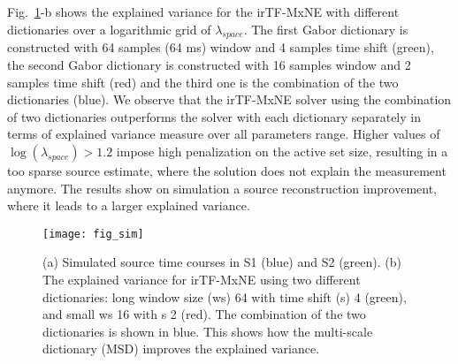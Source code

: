 Fig.~\ref{fig:simulation}-b shows the explained variance for the irTF-MxNE with different dictionaries over a logarithmic grid of $\lambda_{space}$. The first Gabor dictionary is constructed with 64 samples (64 ms) window and 4 samples time shift (green), the second Gabor dictionary is constructed with 16 samples window and 2 samples time shift (red) and the third one is the combination of the two dictionaries (blue). We observe that the irTF-MxNE solver using the combination of two dictionaries outperforms the solver with each dictionary separately in terms of explained variance measure over all parameters range. Higher values of $\log(\lambda_{space})>1.2$ impose high penalization on the active set size, resulting in a too sparse source estimate, where the solution does not explain the measurement anymore. The results show on simulation a source reconstruction improvement, where it leads to a larger explained variance.

\begin{figure}
\centering
	\texttt{[image: fig\_sim]}
    \caption{(a) Simulated source time courses in S1 (blue) and S2 (green). (b) The explained variance for irTF-MxNE using two different dictionaries: long window size (ws) 64 with time shift (s) 4 (green), and small ws 16 with s 2 (red). The combination of the two dictionaries is shown in blue. This shows how the multi-scale dictionary (MSD) improves the explained variance.}
    \label{fig:simulation}
\end{figure}

